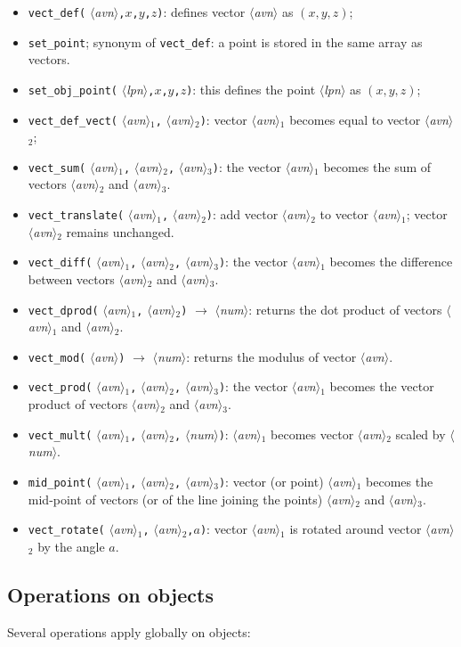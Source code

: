 \documentclass[nonumber,harvardcite]{ltugboat}
\DeclareRobustCommand\meta[1]{%
       \ensuremath{\langle}\emph{#1}\ensuremath{\rangle}}
\newcommand{\AVN}{\meta{avn}}
\newcommand{\LPN}{\meta{lpn}}
\newcommand{\NUM}{\meta{num}}
\newcommand{\tc}{\texttt{,}}
\begin{document}
\begin{itemize}
\item \verb|vect_def(|\AVN\tc$x$\tc$y$\tc$z$\verb|)|: defines vector \AVN{}
as $(x,y,z)$;
\item \verb|set_point|; synonym of \verb|vect_def|: a point is stored in the
same array as vectors.
\item \verb|set_obj_point(|\LPN\tc$x$\tc$y$\tc$z$\verb|)|:
this defines the point \LPN{} as $(x,y,z)$;
\item \verb|vect_def_vect(|\AVN$_1$\tc\AVN$_2$\verb|)|:
vector \AVN$_1$ becomes equal to vector \AVN$_2$;
\item \verb|vect_sum(|\AVN$_1$\tc\AVN$_2$\tc\AVN$_3$\verb|)|: 
the vector \AVN$_1$ becomes the sum of vectors \AVN$_2$ and \AVN$_3$.
\item \verb|vect_translate(|\AVN$_1$\tc\AVN$_2$\verb|)|: 
add  vector \AVN$_2$
to vector \AVN$_1$; vector \AVN$_2$ remains unchanged.
\item \verb|vect_diff(|\AVN$_1$\tc\AVN$_2$\tc\AVN$_3$\verb|)|: 
the vector \AVN$_1$
becomes the difference between vectors \AVN$_2$ and \AVN$_3$.
\item \verb|vect_dprod(|\AVN$_1$\tc\AVN$_2$\verb|)| $\rightarrow $ \NUM{}:
returns the dot product of vectors \AVN$_1$ and \AVN$_2$.
\item \verb|vect_mod(|\AVN\verb|)| $\rightarrow $ \NUM{}: returns the
modulus of vector \AVN. 
\item \verb|vect_prod(|\AVN$_1$\tc\AVN$_2$\tc\AVN$_3$\verb|)|: 
the vector \AVN$_1$
becomes the vector product of vectors \AVN$_2$ and \AVN$_3$.

\item \verb|vect_mult(|\AVN$_1$\tc\AVN$_2$\tc\NUM\verb|)|: \AVN$_1$
becomes vector \AVN$_2$ scaled by \NUM.
\item \verb|mid_point(|\AVN$_1$\tc\AVN$_2$\tc\AVN$_3$\verb|)|: 
vector (or point) \AVN$_1$ becomes the mid-point of vectors (or of the
line joining the points) 
\AVN$_2$ and \AVN$_3$.
\item \verb|vect_rotate(|\AVN$_1$\tc\AVN$_2$\tc$a$\verb|)|: vector \AVN$_1$ is
rotated around vector \AVN$_2$ by the angle $a$. 
\end{itemize}


\subsection{Operations on objects}

Several operations apply globally on objects:
\end{document}
